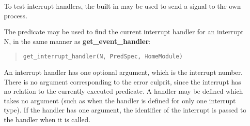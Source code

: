 To test interrupt handlers, the built-in  may be used to send
a signal to the own process.

The predicate 
may be used to find the
current interrupt handler for an interrupt N, in the same manner as
{\bf get_event_handler}:
\begin{quote}
\begin{verbatim}
get_interrupt_handler(N, PredSpec, HomeModule)
\end{verbatim}
\end{quote}

An interrupt handler has one optional argument, which is the interrupt
number.
There is no argument corresponding to the error culprit, since
the interrupt has no relation to the currently executed predicate.
A handler may be defined which takes no argument (such
as when the handler is defined for only one interrupt type).
If the handler has one argument, the identifier of the interrupt is passed
to the handler when it is called.

